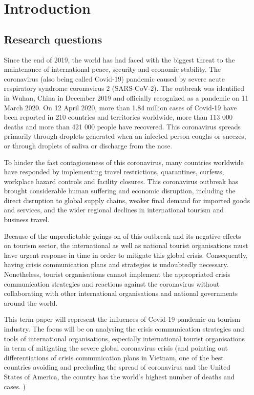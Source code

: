 \documentclass[draft=false
              ,paper=a4
              ,twoside=false
              ,fontsize=12pt
              ,headsepline
              ,BCOR10mm
              ,DIV11
              ]{scrbook}
\begin{document}
\frontmatter



\tableofcontents
\listoffigures
\listoftables
\mainmatter
\chapter{Introduction}
\section{Research questions}

Since the end of 2019, the world has had faced with the biggest threat to the maintenance of international peace, security and economic stability. The coronavirus (also being called Covid-19) pandemic caused by severe acute respiratory syndrome coronavirus 2 (SARS-CoV-2). The outbreak was identified in Wuhan, China in December 2019 and officially recognized as a pandemic on 11 March 2020. On 12 April 2020, more than 1.84 million cases of Covid-19 have been reported in 210 countries and territories worldwide, more than 113 000 deaths and more than 421 000 people have recovered. This coronavirus spreads primarily through droplets generated when an infected person coughs or sneezes, or through droplets of saliva or discharge from the nose. 

To hinder the fast contagiousness of this coronavirus, many countries worldwide have responded by implementing travel restrictions, quarantines, curfews, workplace hazard controls and facility closures. This coronavirus outbreak has brought considerable human suffering and economic disruption, including the direct disruption to global supply chains, weaker final demand for imported goods and services, and the wider regional declines in international tourism and business travel. 

Because of the unpredictable goings-on of this outbreak and its negative effects on tourism sector, the international as well as national tourist organisations must have urgent response in time in order to mitigate this global crisis. Consequently, having crisis communication plans and strategies is undoubtedly necessary. Nonetheless, tourist organisations cannot implement the appropriated crisis communication strategies and reactions against the coronavirus without collaborating with other international organisations and national governments around the world.

This term paper will represent the influences of Covid-19 pandemic on tourism industry. The focus will be on analysing the crisis communication strategies and tools of international organisations, especially international tourist organisations in term of mitigating the severe global coronavirus crisis (and pointing out differentiations of crisis communication plans in Vietnam, one of the best countries avoiding and precluding the spread of coronavirus and the United States of America, the country has the world’s highest number of deaths and cases. )
\end{document}
